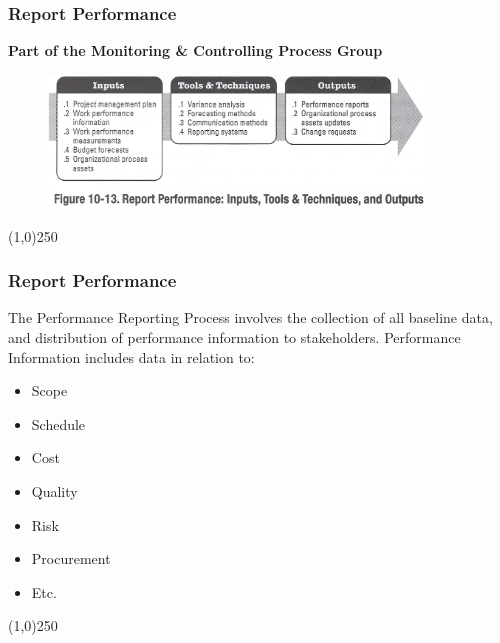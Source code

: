 \begin{frame}
\frametitle{Report Performance}
\textbf{Part of the Monitoring \& Controlling Process Group}
\begin{figure}
	\centering
		\includegraphics[width = 10cm]{images/Fig10-13.jpg}
	\label{fig:10-13}
\end{figure}
\end{frame}\begin{center}\line(1,0){250}\end{center}


\begin{frame}
\frametitle{Report Performance}
The Performance Reporting Process involves the collection of all baseline data, and distribution of performance information to stakeholders.  Performance Information includes data in relation to:
\begin{itemize}
	\item Scope
	\item Schedule
	\item Cost
	\item Quality
	\item Risk
	\item Procurement
	\item Etc.
\end{itemize}
\end{frame}\begin{center}\line(1,0){250}\end{center}


